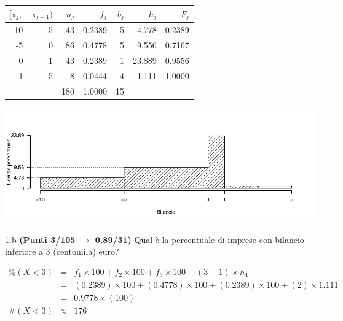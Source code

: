 \documentclass[
  11pt,
]{book}
\theoremstyle{mytheoremstyle}
\theoremstyle{mydefstyle}
\newenvironment{sol}
  {
  \begin{tcolorbox}[enhanced,breakable,arc=0.1mm,boxrule=1pt,colback=white,colframe=iblue,
  title=\bf \fontfamily{lmss}\selectfont \hspace{.5 cm} Soluzione,drop fuzzy shadow]

}{
\end{tcolorbox}
  }
\begin{document}
\begin{sol}

\begin{table}[H]
\centering
\begin{tabular}{rrrrrrr}
\toprule
$[\text{x}_j,$ & $\text{x}_{j+1})$ & $n_j$ & $f_j$ & $b_j$ & $h_j$ & $F_j$\\
\midrule
-10 & -5 & 43 & 0.2389 & 5 & 4.778 & 0.2389\\
-5 & 0 & 86 & 0.4778 & 5 & 9.556 & 0.7167\\
0 & 1 & 43 & 0.2389 & 1 & 23.889 & 0.9556\\
1 & 5 & 8 & 0.0444 & 4 & 1.111 & 1.0000\\
 &  & 180 & 1.0000 & 15 &  & \\
\bottomrule
\end{tabular}
\end{table}

\begin{center}\includegraphics{Esami_passati_con_soluzioni_files/figure-latex/2023-204-1} \end{center}

\end{sol}

1.b \textbf{(Punti 3/105 \(\rightarrow\) 0.89/31)} Qual è la percentuale di imprese con bilancio inferiore a 3 (centomila) euro?

\begin{sol}
\begin{eqnarray*}
     \%(X< 3 ) &=&  f_{ 1 }\times 100+f_{ 2 }\times 100+f_{ 3 }\times 100 +( 3 - 1 )\times h_{ 4 } \\
              &=&  ( 0.2389 )\times 100+( 0.4778 )\times 100+( 0.2389 )\times 100 +( 2 )\times  1.111  \\
              &=&  0.9778 \times(100) \\
     \#(X< 3 ) &\approx& 176 
         \end{eqnarray*}

\end{sol}
\end{document}
